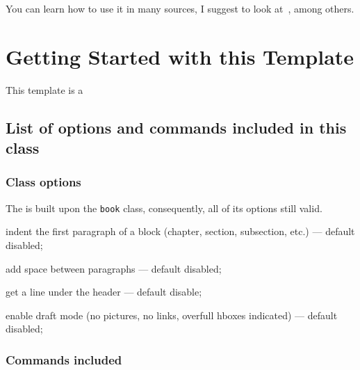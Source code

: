 You can learn how to use it in many sources, I suggest to look at~\cite{tisseau2009tikz,oetiker1995not}, among others.


\section{Getting Started with this Template}

This template is a 

\subsection{List of options and commands included in this class}

\subsubsection{Class options}
The  \urmstic{} is built upon the \texttt{book} class, consequently, all of its options still valid.
 
\newcommand*{\itemt}[1]{\texttt{#1}}
\begin{description}[font=\normalfont\itemt]
	\item[indentfirst] indent the first paragraph of a  block (chapter, section, subsection, etc.) --- default disabled;
	\item[parskip] add space between paragraphs --- default disabled;
	\item[headsepline] get a line under the header --- default disable;
	\item[draft]  enable draft mode (no pictures, no links, overfull hboxes indicated) --- default disabled;
	
\end{description}

\subsubsection{Commands included}


